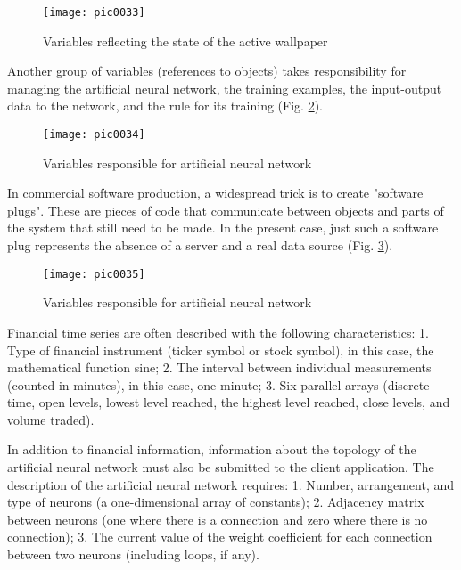 \begin{figure}[h]
\centering
\texttt{[image: pic0033]}
\caption{Variables reflecting the state of the active wallpaper}
\label{fig:pic0033}
\end{figure}
\FloatBarrier

Another group of variables (references to objects) takes responsibility for managing the artificial neural network, the training examples, the input-output data to the network, and the rule for its training (Fig. \ref{fig:pic0034}).

\begin{figure}[h]
\centering
\texttt{[image: pic0034]}
\caption{Variables responsible for artificial neural network}
\label{fig:pic0034}
\end{figure}
\FloatBarrier

In commercial software production, a widespread trick is to create "software plugs". These are pieces of code that communicate between objects and parts of the system that still need to be made. In the present case, just such a software plug represents the absence of a server and a real data source (Fig. \ref{fig:pic0035}).

\begin{figure}[h]
\centering
\texttt{[image: pic0035]}
\caption{Variables responsible for artificial neural network}
\label{fig:pic0035}
\end{figure}
\FloatBarrier

Financial time series are often described with the following characteristics: 1. Type of financial instrument (ticker symbol or stock symbol), in this case, the mathematical function sine; 2. The interval between individual measurements (counted in minutes), in this case, one minute; 3. Six parallel arrays (discrete time, open levels, lowest level reached, the highest level reached, close levels, and volume traded).

In addition to financial information, information about the topology of the artificial neural network must also be submitted to the client application. The description of the artificial neural network requires: 1. Number, arrangement, and type of neurons (a one-dimensional array of constants); 2. Adjacency matrix between neurons (one where there is a connection and zero where there is no connection); 3. The current value of the weight coefficient for each connection between two neurons (including loops, if any).

